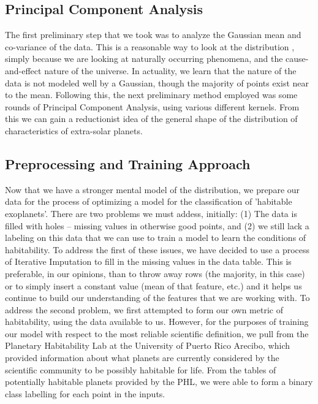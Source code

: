 \documentclass[11.5pt]{article}
\begin{document}
\subsection{Principal Component Analysis} 
The first preliminary step that we took was to analyze the Gaussian mean and co-variance of the data. This is a reasonable way to look at the distribution , simply because we are looking at naturally occurring phenomena, and the cause-and-effect nature of the universe. In actuality, we learn that the nature of the data is not modeled well by a Gaussian, though the majority of points exist near to the mean. Following this, the next preliminary method employed was some rounds of Principal Component Analysis, using various different kernels. From this we can gain a reductionist idea of the general shape of the distribution of characteristics of extra-solar planets. 

\subsection{Preprocessing and Training Approach}
Now that we have a stronger mental model of the distribution, we prepare our data for the process of optimizing a model for the classification of 'habitable exoplanets'. There are two problems we must addess, initially: (1) The data is filled with holes -- missing values in otherwise good points, and (2) we still lack a labeling on this data that we can use to train a model to learn the conditions of habitability. To address the first of these issues, we have decided to use a process of Iterative Imputation to fill in the missing values in the data table. This is preferable, in our opinions, than to throw away rows (the majority, in this case) or to simply insert a constant value (mean of that feature, etc.) and it helps us continue to build our understanding of the features that we are working with. To address the second problem, we first attempted to form our own metric of habitability, using the data available to us. However, for the purposes of training our model with respect to the most reliable scientific definition, we pull from the Planetary Habitability Lab at the University of Puerto Rico Arecibo, which provided information about what planets are currently considered by the scientific community to be possibly habitable for life. From the tables of potentially habitable planets provided by the PHL, we were able to form a binary class labelling for each point in the inputs. 
\end{document}
